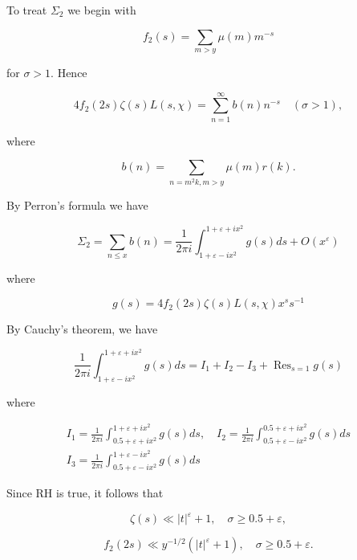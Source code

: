 \documentclass[10pt]{article}
\begin{document}
To treat $\Sigma_{2}$ we begin with

$$
f_{2}(s)=\sum_{m>y} \mu(m) m^{-s}
$$

for $\sigma>1$. Hence


\begin{equation*}
4 f_{2}(2 s) \zeta(s) L(s, \chi)=\sum_{n=1}^{\infty} b(n) n^{-s} \quad(\sigma>1), \tag{3.5}
\end{equation*}


where

$$
b(n)=\sum_{n=m^{2} k, m>y} \mu(m) r(k).
$$

By Perron's formula we have


\begin{equation*}
\Sigma_{2}=\sum_{n \leq x} b(n)=\frac{1}{2 \pi i} \int_{1+\varepsilon-i x^{2}}^{1+\varepsilon+i x^{2}} g(s) d s+O\left(x^{\varepsilon}\right) \tag{3.6}
\end{equation*}


where

$$
g(s)=4 f_{2}(2 s) \zeta(s) L(s, \chi) x^{s} s^{-1}
$$

By Cauchy's theorem, we have


\begin{equation*}
\frac{1}{2 \pi i} \int_{1+\varepsilon-i x^{2}}^{1+\varepsilon+i x^{2}} g(s) d s=I_{1}+I_{2}-I_{3}+\operatorname{Res}_{s=1} g(s) \tag{3.7}
\end{equation*}


where

$$
\begin{gathered}
I_{1}=\frac{1}{2 \pi i} \int_{0.5+\varepsilon+i x^{2}}^{1+\varepsilon+i x^{2}} g(s) d s, \quad I_{2}=\frac{1}{2 \pi i} \int_{0.5+\varepsilon-i x^{2}}^{0.5+\varepsilon+i x^{2}} g(s) d s \\
I_{3}=\frac{1}{2 \pi i} \int_{0.5+\varepsilon-i x^{2}}^{1+\varepsilon-i x^{2}} g(s) d s
\end{gathered}
$$

Since RH is true, it follows that


\begin{equation*}
\zeta(s) \ll|t|^{\varepsilon}+1, \quad \sigma \geq 0.5+\varepsilon, \tag{3.8}
\end{equation*}



\begin{equation*}
f_{2}(2 s) \ll y^{-1 / 2}\left(|t|^{\varepsilon}+1\right), \quad \sigma \geq 0.5+\varepsilon . \tag{3.9}
\end{equation*}
\end{document}
